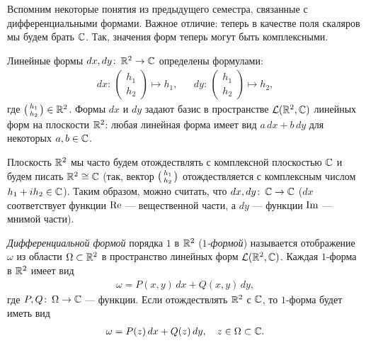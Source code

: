 Вспомним некоторые понятия из предыдущего семестра, связанные с дифференциальными формами. Важное отличие: теперь в качестве поля скаляров мы будем брать $\mathbb{C}$. Так, значения форм теперь могут быть комплексными.
\begin{df*}
 Линейные формы $dx, dy \colon\, \mathbb{R}^{2} \to \mathbb{C}$ определены формулами:
 \begin{align*}
  dx \colon\, \begin{pmatrix}
   h_1 \\ h_2
  \end{pmatrix} \mapsto h_1, & &dy \colon\, \begin{pmatrix}
   h_1 \\ h_2
  \end{pmatrix} \mapsto h_2,
 \end{align*} где $ \begin{psmallmatrix}
  h_1 \\ h_2
 \end{psmallmatrix} \in \mathbb{R}^{2}$. Формы $dx$ и $dy$ задают базис в пространстве $\mathcal{L}(\mathbb{R}^{2}, \mathbb{C})$ линейных форм на плоскости $\mathbb{R}^{2}$: любая линейная форма имеет вид $a \, dx + b \, dy$ для некоторых $a,b \in \mathbb{C}$.

 Плоскость $\mathbb{R}^{2}$ мы часто будем отождествлять с комплексной плоскостью $\mathbb{C}$ и будем писать $\mathbb{R}^{2} \cong \mathbb{C}$ (так, вектор $ \begin{psmallmatrix}
  h_1 \\ h_2
 \end{psmallmatrix}$ отождествляется с комплексным числом $h_1 + i h_2 \in \mathbb{C}$). Таким образом, можно считать, что $dx, dy \colon\, \mathbb{C} \to \mathbb{C}$ ($dx$ соответствует функции $\operatorname{Re}$ --- вещественной части, а $dy$ --- функции $\operatorname{Im}$ --- мнимой части).

 \textit{Дифференциальной формой} порядка $1$ в $\mathbb{R}^{2}$ (\textit{$1$-формой}) называется отображение $\omega$ из области $\Omega \subset \mathbb{R}^{2}$ в пространство линейных форм $\mathcal{L}(\mathbb{R}^{2}, \mathbb{C})$. Каждая $1$-форма в $\mathbb{R}^{2}$ имеет вид
 \begin{align}
  \label{equation:1-form}
  \omega = P(x,y)\,dx + Q(x,y)\,dy
 ,\end{align} где $P, Q \colon\, \Omega \to \mathbb{C}$ --- функции. Если отождествлять $\mathbb{R}^{2}$ с $\mathbb{C}$, то $1$-форма будет иметь вид
 \begin{align*}
  \omega = P(z)\,dx + Q(z)\,dy, \quad z \in \Omega \subset \mathbb{C}
 .\end{align*} 
\end{df*}
